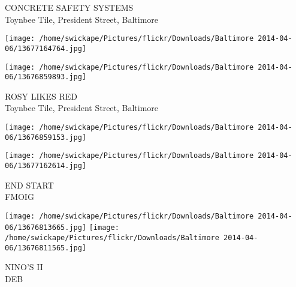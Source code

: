 \documentclass[10pt,letterpaper]{article}
\begin{document}
CONCRETE SAFETY SYSTEMS\\
Toynbee Tile, President Street, Baltimore
\pagebreak

\texttt{[image: /home/swickape/Pictures/flickr/Downloads/Baltimore 2014-04-06/13677164764.jpg]}

\vspace{0.25in}
\texttt{[image: /home/swickape/Pictures/flickr/Downloads/Baltimore 2014-04-06/13676859893.jpg]}

ROSY LIKES RED\\
Toynbee Tile, President Street, Baltimore
\pagebreak

\texttt{[image: /home/swickape/Pictures/flickr/Downloads/Baltimore 2014-04-06/13676859153.jpg]}

\vspace{0.25in}
\texttt{[image: /home/swickape/Pictures/flickr/Downloads/Baltimore 2014-04-06/13677162614.jpg]}

END START\\
FMOIG
\pagebreak

\texttt{[image: /home/swickape/Pictures/flickr/Downloads/Baltimore 2014-04-06/13676813665.jpg]}
\texttt{[image: /home/swickape/Pictures/flickr/Downloads/Baltimore 2014-04-06/13676811565.jpg]}

NINO'S II\\
DEB
\pagebreak
\end{document}
